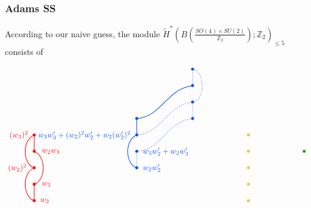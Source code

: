 \documentclass[12pt]{article}
\numberwithin{equation}{section}
\newcommand*{\colorA}[1]{\textcolor{colorA}{#1}}
\newcommand*{\colorB}[1]{\textcolor{colorB}{#1}}
\newcommand*{\colorC}[1]{\textcolor{colorC}{#1}}
\newcommand*{\colorD}[1]{\textcolor{colorD}{#1}}
\let\tilde\widetilde
\def\bZ{\mathbb{Z}}
\begin{document}
\subsubsection{Adams SS}
According to our naive guess, the module $\tilde H^\ast(B\left(\tfrac{SO(4)\times SU(2)}{\bZ_2}\right);\bZ_2)_{\leq 5}$ consists of
\begin{equation}
	\begin{tikzpicture}[thick,baseline=(m-2-4.south)]
		\matrix (m) [
			matrix of math nodes,
			row sep= 1em,
			column sep=6em,
		]{
			&&& \colorB{\bullet}\\
			&&& \colorB{\bullet}\\
			&&& \colorB{\bullet}\\
			&& \colorB{\bullet} & \colorB{\bullet}\\
			\colorA{\bullet} && \colorB{\bullet} && \colorC{\bullet}\\
		    \colorA{\bullet} && \colorB{\bullet} && \colorC{\bullet} & \colorD{\bullet}\\
			\colorA{\bullet} && \colorB{\bullet} && \colorC{\bullet}\\
			\colorA{\bullet} &&&& \colorC{\bullet}\\
			\colorA{\bullet} &&&& \colorC{\bullet}\\
		};
		\draw[colorA] (m-7-1.center) to [out=200, in=160] (m-9-1.center);
		\draw[colorA] (m-9-1.center) to (m-8-1.center);
		\draw[colorA] (m-5-1.center) to [out=200, in=160] (m-7-1.center);
		\draw[colorA] (m-6-1.center) to (m-5-1.center);
		\draw[colorA] (m-6-1.center) to [out=340, in=20] (m-8-1.center);
		\node[colorA, right=4pt] at (m-9-1) {$w_2$};
		\node[colorA, right=6pt] at (m-8-1) {$w_3$};
		\node[colorA, left=6pt] at (m-7-1) {$(w_2)^2$};
		\node[colorA, right=6pt] at (m-6-1) {$w_2w_3$};
		\node[colorA, left=4pt] at (m-5-1) {$(w_3)^2$};
		\draw[colorB] (m-7-3.center) to [out=160, in=200] (m-5-3.center);
		\draw[colorB, dotted] (m-7-3.center) to (m-6-3.center);
		\draw[colorB, dotted] (m-6-3.center) to [out=5, in=185] (m-4-4.center);
		\draw[colorB] (m-5-3.center) to (m-4-3.center);
		\draw[colorB, dotted] (m-5-3.center) to [out=5, in=185] (m-3-4.center);
		\draw[colorB, dotted] (m-4-4.center) to (m-3-4.center);
		\draw[colorB] (m-4-3.center) to [out=5, in=185] (m-2-4.center);
		\draw[colorB, dotted] (m-2-4.center) to (m-1-4.center);
		\draw[colorB, dotted] (m-3-4.center) to [out=5, in=355] (m-1-4.center);
		\node[colorB, right=4pt] at (m-7-3) {$w_2w'_2$};
		\node[colorB, right=4pt] at (m-6-3) {$w_3w'_2 + w_2w'_3$};
		\node[colorB, left=4pt] at (m-5-3) {$w_3w'_3 + (w_2)^2w'_2 + w_2(w'_2)^2$};

\end{tikzpicture}
\end{equation}
\end{document}
